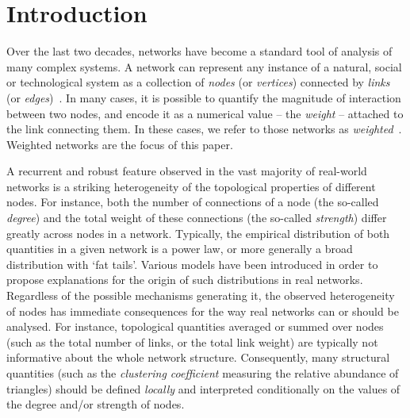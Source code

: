 \documentclass[aps,twocolumn,superscriptaddress]{revtex4-1}
\begin{document}
\maketitle
\section{Introduction}


Over the last two decades, networks have become a standard tool of analysis of many complex systems. 
A network can represent any instance of a natural, social or technological system as a collection of \emph{nodes} (or \emph{vertices}) connected by \emph{links} (or \emph{edges})~\cite{boccaletti-physrep-2006, newman-book-2010, barabasi-natphys-2011,liljeros-nature-2001, bullmore-nat_rev_neuro-2009, maslov-science-2002, guimera-science-2005, barthelemy-physrep-2011}. In many cases, it is possible to quantify the magnitude of interaction between two nodes, and encode it as a numerical value -- the \emph{weight} -- attached to the link connecting them. In these cases, we refer to those networks as \emph{weighted}~\cite{barrat-pnas-2004}. Weighted networks are the focus of this paper.

A recurrent and robust feature observed in the vast majority of real-world networks is a striking heterogeneity of the topological properties of different nodes. 
For instance, both the number of connections of a node (the so-called \emph{degree}) and the total weight of these connections (the so-called \emph{strength}) differ greatly across nodes in a network. 
Typically, the empirical distribution of both quantities in a given network is a power law, or more generally a broad distribution with `fat tails'.
Various models have been introduced in order to propose explanations for the origin of such distributions in real networks.
Regardless of the possible mechanisms generating it, the observed heterogeneity of nodes has immediate consequences for the way real networks can or should be analysed. 
For instance, topological quantities averaged or summed over nodes (such as the total number of links, or the total link weight) are typically not informative about the whole network structure. 
Consequently, many structural quantities (such as the \emph{clustering coefficient} measuring the relative abundance of triangles) should be defined \emph{locally} and interpreted conditionally on the values of the degree and/or strength of nodes. 
\end{document}
